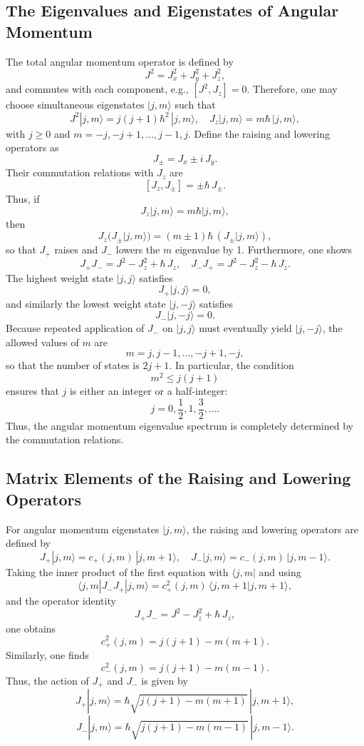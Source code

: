 \documentclass[twocolumn]{article}
\begin{document}
\begin{spacing}{1}
  \subsection{The Eigenvalues and Eigenstates of Angular Momentum}
  The total angular momentum operator is defined by
  \[
  J^2=J_x^2+J_y^2+J_z^2,
  \]
  and commutes with each component, e.g., \([J^2,J_z]=0\). Therefore, one may choose simultaneous eigenstates \(|j,m\rangle\) such that
  \[
  J^2|j,m\rangle=j(j+1)\hbar^2\,|j,m\rangle,\quad J_z|j,m\rangle=m\hbar\,|j,m\rangle,
  \]
  with \(j\ge0\) and \(m=-j,-j+1,\ldots,j-1,j\). Define the raising and lowering operators as
  \[
  J_{\pm}=J_x\pm i\,J_y.
  \]
  Their commutation relations with \(J_z\) are
  \[
  [J_z,J_{\pm}]=\pm\hbar\,J_{\pm}.
  \]
  Thus, if
  \[
  J_z|j,m\rangle=m\hbar|j,m\rangle,
  \]
  then
  \[
  J_z\bigl(J_{\pm}|j,m\rangle\bigr)=(m\pm1)\hbar\,(J_{\pm}|j,m\rangle),
  \]
  so that \(J_+\) raises and \(J_-\) lowers the \(m\) eigenvalue by 1. Furthermore, one shows
  \[
  J_+J_-=J^2-J_z^2+\hbar\,J_z,\quad J_-J_+=J^2-J_z^2-\hbar\,J_z.
  \]
  The highest weight state \(|j,j\rangle\) satisfies
  \[
  J_+|j,j\rangle=0,
  \]
  and similarly the lowest weight state \(|j,-j\rangle\) satisfies
  \[
  J_-|j,-j\rangle=0.
  \]
  Because repeated application of \(J_-\) on \(|j,j\rangle\) must eventually yield \(|j,-j\rangle\), the allowed values of \(m\) are
  \[
  m=j,j-1,\ldots,-j+1,-j,
  \]
  so that the number of states is \(2j+1\). In particular, the condition
  \[
  m^2\le j(j+1)
  \]
  ensures that \(j\) is either an integer or a half-integer:
  \[
  j=0,\frac{1}{2},1,\frac{3}{2},\ldots.
  \]
  Thus, the angular momentum eigenvalue spectrum is completely determined by the commutation relations.  

  \subsection{Matrix Elements of the Raising and Lowering Operators}
  For angular momentum eigenstates \(|j,m\rangle\), the raising and lowering operators are defined by 
  \[
  J_{+}|j,m\rangle = c_{+}(j,m)\,|j,m+1\rangle,\quad J_{-}|j,m\rangle = c_{-}(j,m)\,|j,m-1\rangle.
  \]
  Taking the inner product of the first equation with \(\langle j,m|\) and using
  \[
  \langle j,m|J_{-}J_{+}|j,m\rangle = c_{+}^2(j,m)\,\langle j,m+1|j,m+1\rangle,
  \]
  and the operator identity
  \[
  J_{+}J_{-} = J^2 - J_{z}^2 + \hbar\,J_{z},
  \]
  one obtains
  \[
  c_{+}^2(j,m)= j(j+1)-m(m+1).
  \]
  Similarly, one finds
  \[
  c_{-}^2(j,m)= j(j+1)-m(m-1).
  \]
  Thus, the action of \(J_{+}\) and \(J_{-}\) is given by
  \[
  J_{+}|j,m\rangle = \hbar\sqrt{j(j+1)-m(m+1)}\,|j,m+1\rangle,\]
  \[
   J_{-}|j,m\rangle = \hbar\sqrt{j(j+1)-m(m-1)}\,|j,m-1\rangle.
  \]
  

\end{spacing}
\end{document}
